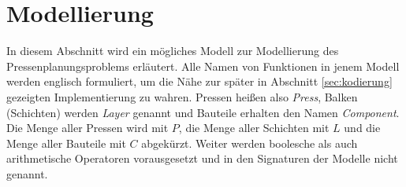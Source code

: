 \section{Modellierung}
\label{sec:modellierung}
In diesem Abschnitt wird ein mögliches Modell zur Modellierung des Pressenplanungsproblems erläutert.
Alle Namen von Funktionen in jenem Modell werden englisch formuliert, um die Nähe zur später in Abschnitt \ref{sec:kodierung} gezeigten Implementierung zu wahren.
Pressen heißen also \textit{Press}, Balken (Schichten) werden \textit{Layer} genannt und Bauteile erhalten den Namen \textit{Component}.
Die Menge aller Pressen wird mit $P$, die Menge aller Schichten mit $L$ und die Menge aller Bauteile mit $C$ abgekürzt.
Weiter werden boolesche als auch arithmetische Operatoren vorausgesetzt und in den Signaturen der Modelle nicht genannt.

